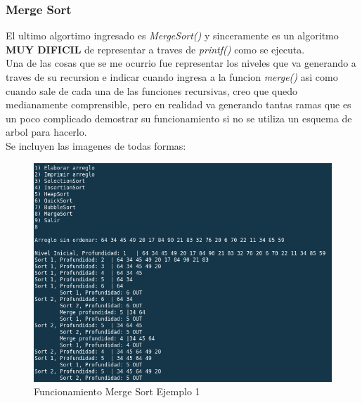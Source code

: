 \documentclass{article}
\begin{document}
		\subsubsection{Merge Sort}
		
		El ultimo algortimo ingresado es \emph{MergeSort()} y sinceramente es un algoritmo \textbf{MUY DIFICIL} de representar a traves de \emph{printf()} como se ejecuta.\\
		
		Una de las cosas que se me ocurrio fue representar los niveles que va generando a traves de su recursion e indicar cuando ingresa a la funcion \emph{merge()} asi como cuando sale de cada una de las funciones recursivas, creo que quedo medianamente comprensible, pero en realidad va generando tantas ramas que es un poco complicado demostrar su funcionamiento si no se utiliza un esquema de arbol para hacerlo.\\
		
		Se incluyen las imagenes de todas formas:
		
		\begin{figure}[H]
			\centering
			\includegraphics[scale = 0.6]{images/e3m1.png}
			\caption{Funcionamiento Merge Sort Ejemplo 1}
		\end{figure}
	
\end{document}

